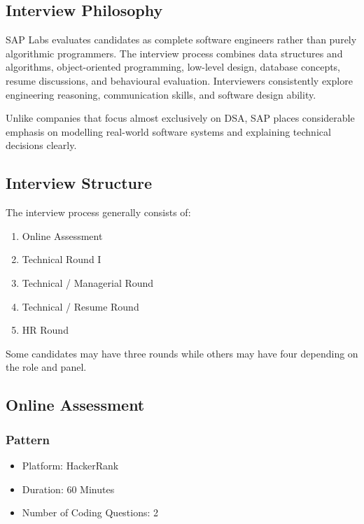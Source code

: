 \documentclass[11pt,a4paper]{article}
\begin{document}
\subsection{Interview Philosophy}

SAP Labs evaluates candidates as complete software engineers rather than purely algorithmic programmers. The interview process combines data structures and algorithms, object-oriented programming, low-level design, database concepts, resume discussions, and behavioural evaluation. Interviewers consistently explore engineering reasoning, communication skills, and software design ability.

Unlike companies that focus almost exclusively on DSA, SAP places considerable emphasis on modelling real-world software systems and explaining technical decisions clearly.


\subsection{Interview Structure}

The interview process generally consists of:

\begin{enumerate}
	\item Online Assessment
	\item Technical Round I
	\item Technical / Managerial Round
	\item Technical / Resume Round
	\item HR Round
\end{enumerate}

Some candidates may have three rounds while others may have four depending on the role and panel.


\subsection{Online Assessment}

\subsubsection{Pattern}

\begin{itemize}
	\item Platform: HackerRank
	\item Duration: 60 Minutes
	\item Number of Coding Questions: 2
\end{itemize}
\end{document}
